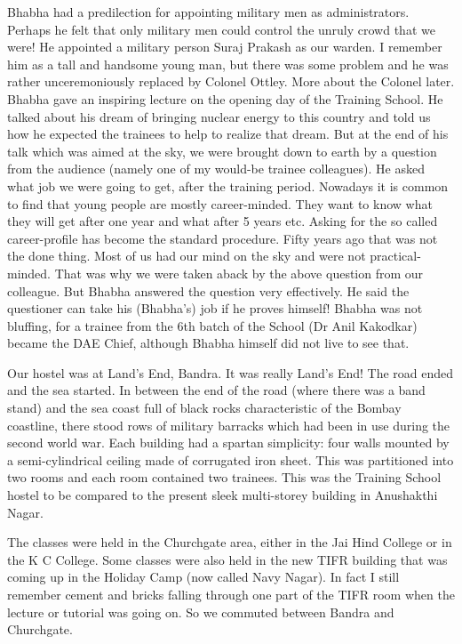 Bhabha had a predilection for appointing military men as admini\-strators. Perhaps he felt that only military men could control the unruly crowd that we were! He appointed a military person Suraj Prakash as our warden. I remember him as a tall and handsome young man, but there was some problem and he was rather unceremoniously replaced by Colonel Ottley. More about the Colonel later.
\vskip 1pt
Bhabha gave an inspiring lecture on the opening day of the Training School. He talked about his dream of bringing nuclear energy to this country and told us how he expected the trainees to help to realize that dream. But at the end of his talk which was aimed at the sky, we were brought down to earth by a question from the audience (namely  one of my would-be trainee collea\-gues). He asked what job we were going to get, after the training period. Nowadays it is common to find that young people are mostly career-minded. They want to know what they will get after one year and what after 5 years etc. Asking for the so called career-profile has become the standard procedure. Fifty years ago that was not the done thing. Most of us had our mind on the sky and were not practical-minded. That was why we were taken aback by the above question from our colleague. But  Bhabha answered the question very effectively. He said the questioner can take his (Bhabha's) job if he proves himself! Bhabha was not bluffing, for a trainee from the 6th batch of the School (Dr Anil Kakodkar) became the DAE Chief, although Bhabha himself did not live to see that.


Our hostel was at Land's End, Bandra. It was really Land's End! The road ended and the sea started. In between the end of the road (where there was a band stand) and the sea coast full of black rocks characteristic of the Bombay coastline, there stood rows of military barracks which had been in use during the second world war. Each building had a spartan simplicity: four walls mounted by a semi-cylindrical ceiling made of corrugated iron sheet. This was partitioned into two rooms and each room contained two trainees. This was the Training School hostel to be compared to the present sleek multi-storey building in Anushakthi Nagar.

The classes were held in the Churchgate area, either in the Jai Hind College or in the K C College. Some classes were also held in the new TIFR building that was coming up in the Holiday Camp (now called Navy Nagar). In fact I still remember cement and bricks falling through one part of the TIFR room when the lecture or tutorial was going on. So we commuted between Bandra and Churchgate.

